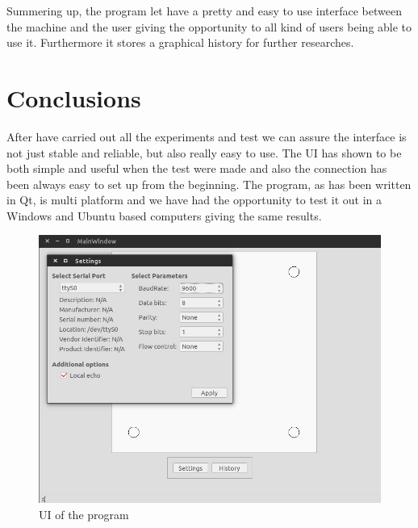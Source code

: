 		Summering up, the program let have a pretty and easy to use interface between the machine and the user giving the opportunity to all kind of users being able to use it. Furthermore it stores a graphical history for further researches.

	\section{Conclusions} %
	\label{sec:high_level_programming_conclusions}
		After have carried out all the experiments and test we can assure the interface is not just stable and reliable, but also really easy to use. 
		The UI has shown to be both simple and useful when the test were made and also the connection has been always easy to set up from the beginning.
		The program, as has been written in Qt, is multi platform and we have had the opportunity to test it out in a Windows and Ubuntu based computers giving the same results.

		\begin{figure}[hb!]
			\begin{center}
				\includegraphics[width=.8\textwidth]{figures/UI}
			\end{center}
			\caption{UI of the program}
			\label{fig:ui}
		\end{figure}
